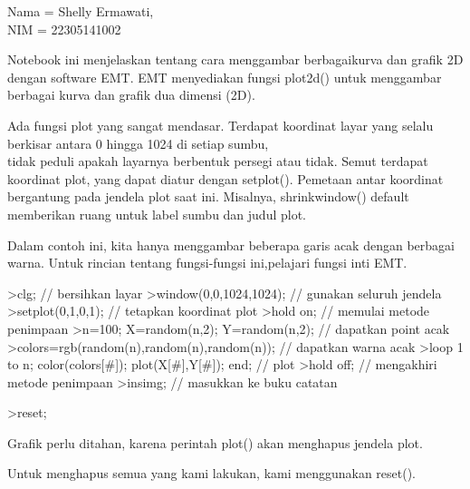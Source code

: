 \documentclass{article}
\begin{document}
\begin{eulernotebook}
\eulerheading{}
\begin{eulercomment}
Nama = Shelly Ermawati,\\
NIM = 22305141002

\begin{eulercomment}
\begin{eulercomment}
Notebook ini menjelaskan tentang cara menggambar berbagaikurva dan
grafik 2D dengan software EMT. EMT menyediakan fungsi plot2d() untuk
menggambar berbagai kurva dan grafik dua dimensi (2D).\\
\end{eulercomment}
\begin{eulercomment}
Ada  fungsi  plot  yang  sangat  mendasar.  Terdapat  koordinat  layar
yang  selalu  berkisar  antara  0  hingga  1024  di  setiap  sumbu,\\
tidak  peduli  apakah  layarnya  berbentuk  persegi  atau  tidak.
Semut terdapat  koordinat  plot,  yang  dapat  diatur  dengan
setplot(). Pemetaan  antar  koordinat bergantung  pada jendela  plot
saat  ini. Misalnya,  shrinkwindow() default memberikan ruang untuk
label sumbu dan judul  plot.

Dalam  contoh  ini,  kita  hanya  menggambar  beberapa  garis  acak
dengan  berbagai  warna.  Untuk  rincian  tentang  fungsi-fungsi
ini,pelajari  fungsi  inti  EMT.
\end{eulercomment}
\begin{eulerprompt}
>clg; // bersihkan layar
>window(0,0,1024,1024); // gunakan seluruh jendela 
>setplot(0,1,0,1); // tetapkan koordinat plot
>hold on; // memulai metode penimpaan 
>n=100; X=random(n,2); Y=random(n,2);  // dapatkan point acak
>colors=rgb(random(n),random(n),random(n)); // dapatkan warna acak 
>loop 1 to n; color(colors[#]); plot(X[#],Y[#]); end; // plot
>hold off; // mengakhiri metode penimpaan
>insimg; // masukkan ke buku catatan
\end{eulerprompt}
\begin{eulerprompt}
>reset;
\end{eulerprompt}
\begin{eulercomment}
Grafik  perlu  ditahan,  karena  perintah  plot()  akan  menghapus
jendela  plot.

Untuk  menghapus  semua  yang  kami  lakukan,  kami  menggunakan
reset().


\end{eulercomment}
\end{eulercomment}
\end{eulercomment}
\end{eulernotebook}
\end{document}
